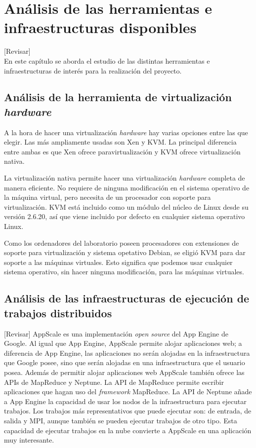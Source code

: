 \chapter{Análisis de las herramientas e infraestructuras disponibles}
\label{cap:estudio}

[Revisar]\\

En este capítulo se aborda el estudio de las distintas herramientas e infraestructuras de interés para la realización del proyecto.


\section{Análisis de la herramienta de virtualización \emph{hardware}}

A la hora de hacer una virtualización \emph{hardware} hay varias opciones entre las que elegir. Las más ampliamente usadas son Xen y KVM. La principal diferencia entre ambas es que Xen ofrece paravirtualización y KVM ofrece virtualización nativa.

La virtualización nativa permite hacer una virtualización \emph{hardware} completa de manera eficiente. No requiere de ninguna modificación en el sistema operativo de la máquina virtual, pero necesita de un procesador con soporte para virtualización. KVM está incluido como un módulo del núcleo de Linux desde su versión 2.6.20, así que viene incluido por defecto en cualquier sistema operativo Linux.

Como los ordenadores del laboratorio poseen procesadores con extensiones de soporte para virtualización y sistema opetativo Debian, se eligió KVM para dar soporte a las máquinas virtuales. Esto significa que podemos usar cualquier sistema operativo, sin hacer ninguna modificación, para las máquinas virtuales.


\section{Análisis de las infraestructuras de ejecución de trabajos distribuidos}

[Revisar]
AppScale es una implementación \emph{open source} del App Engine de Google. Al igual que App Engine, AppScale permite alojar aplicaciones web; a diferencia de App Engine, las aplicaciones no serán alojadas en la infraestructura que Google posee, sino que serán alojadas en una infraestructura que el usuario posea. Además de permitir alojar aplicaciones web AppScale también ofrece las APIs de MapReduce y Neptune. La API de MapReduce permite escribir aplicaciones que hagan uso del \emph{framework} MapReduce. La API de Neptune añade a App Engine la capacidad de usar los nodos de la infraestructura para ejecutar trabajos. Los trabajos más representativos que puede ejecutar son: de entrada, de salida y MPI, aunque también se pueden ejecutar trabajos de otro tipo. Esta capacidad de ejecutar trabajos en la nube convierte a AppScale en una aplicación muy interesante.

